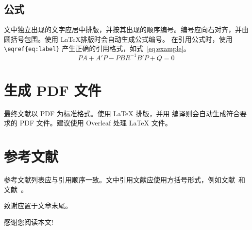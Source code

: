 \documentclass[10pt]{article}
\begin{document}
\subsection{公式}
文中独立出现的文字应居中排版，并按其出现的顺序编号。编号应向右对齐，并由圆括号包围。使用 \LaTeX 排版时会自动生成公式编号。
在引用公式时，使用 \verb|\eqref{eq:label}| 产生正确的引用格式，如式~\eqref{eq:example}。
\begin{equation}
\label{eq:example}
	    PA + A'P - PBR^{-1}B'P + Q  =  0
\end{equation}

\section{生成 PDF 文件}
最终文献以 PDF 为标准格式。使用 \LaTeX{} 排版，并用  编译则会自动生成符合要求的 PDF 文件。建议使用 Overleaf 处理 \LaTeX{} 文件。

\section{参考文献}
参考文献列表应与引用顺序一致。文中引用文献应使用方括号形式，例如文献~\cite{ref01}和文献~\cite{ref01,ref02}。

\acknowledgements
致谢应置于文章末尾。

感谢您阅读本文!


\end{document}
